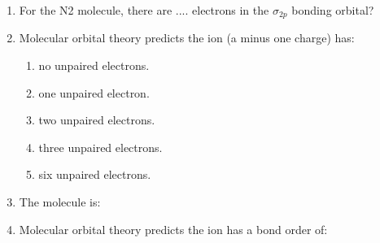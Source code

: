 \documentclass[main.tex]{subfiles}
\begin{document}
\begin{fullwidth}
\begin{multicols*}{2}
\begin{enumerate}
\item For the N2 molecule, there are .... electrons in the $\sigma_{2p}$  bonding orbital?
\begin{enumerate}[label=(\alph*)]
\end{enumerate}\vspace{-0.5cm}
	
		
\item	Molecular orbital theory predicts the  ion (a minus one charge) has:
\begin{enumerate}[label=(\alph*)] 
\item 	no unpaired electrons.
\item 	one unpaired electron.
\item 	two unpaired electrons.
\item 	three unpaired electrons.
\item 	six unpaired electrons.
\end{enumerate} 
	
\item The  molecule is:
\begin{enumerate}[label=(\alph*)]\vspace{-0.5cm}
\end{enumerate}\vspace{-0.5cm}
		
\item	Molecular orbital theory predicts the  ion has a bond order of:
\begin{enumerate}[label=(\alph*)]\vspace{-0.5cm}
\end{enumerate}\vspace{-0.5cm}
		

\end{enumerate}
\end{multicols*}
\end{fullwidth}
\end{document}
